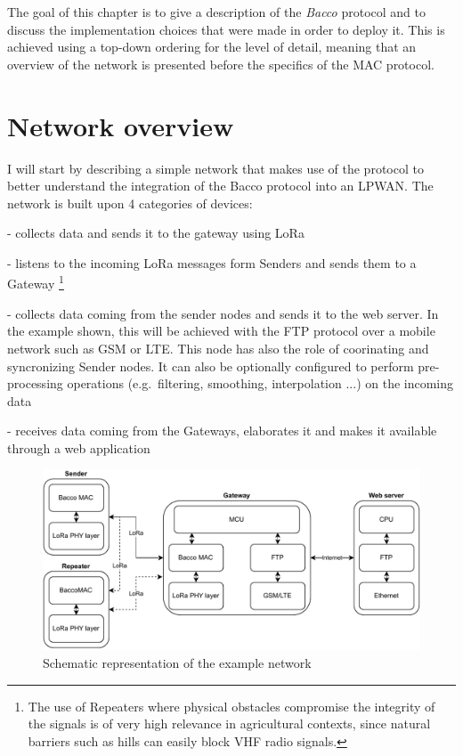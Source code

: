 The goal of this chapter is to give a description of the \textit{Bacco} protocol and to discuss the
implementation choices that were made in order to deploy it. This is achieved using a top-down ordering for the level
of detail, meaning that an overview of the network is presented before the specifics of the MAC protocol.

\section{Network overview}
I will start by describing a simple network that makes use of the protocol to better understand the integration of the
Bacco protocol into an LPWAN. The network is built upon 4 categories of devices:

\begin{description}[font=$\bullet$~\normalfont\scshape\color{blue!50!black}]
    \item [Sender node] - collects data and sends it to the gateway using LoRa
    \item [Repeater node] - listens to the incoming LoRa messages form Senders and sends them to a Gateway \footnote{The use of Repeaters where
            physical obstacles compromise the integrity of the signals is of very high
        relevance in agricultural contexts, since natural barriers such as hills can easily block \gls{VHF} radio signals.}
    \item [Gateway node] - collects data coming from the sender nodes and sends it to the web server. In the example
        shown, this will be achieved with the FTP protocol over a mobile network such as \gls{GSM} or \gls{LTE}. This node has
        also the role of coorinating and syncronizing Sender nodes. It can also be optionally configured to perform pre-processing operations (e.g.\ filtering, smoothing, interpolation ...) on the incoming data
    \item [Web server] - receives data coming from the Gateways, elaborates it and makes it available
        through a web application
\end{description}

\begin{figure}[ht]
    \centering
    \includegraphics[width=1.0\textwidth]{uml/network_stack.pdf}
    \caption{Schematic representation of the example network}
    \label{network stack img}
\end{figure}

